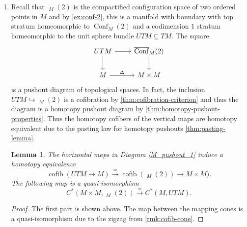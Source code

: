 \documentclass{scrartcl}
\theoremstyle{plain}
\newtheorem{lemma}[theorem]{Lemma}
\theoremstyle{definition}
\renewcommand{\subset}{\subseteq}
\DeclareMathOperator{\cone}{cone}
\DeclareMathOperator{\cofib}{cofib}
\newcommand{\quiso}{\simeq}
\let\xto\xrightarrow
\newcommand{\injto}{\hookrightarrow}
\DeclareMathOperator{\Conf}{Conf}
\DeclareMathOperator{\cConf}{\overline{Conf}}
\begin{document}
\begin{enumerate}[(1)]
    \item
Recall that $\cConf_M(2)$ is the compactified configuration space of two ordered points in $M$ and by \cref{ex:conf-2}, this is a manifold with boundary with top stratum homeomorphic to $\Conf_M(2)$ and a codimension $1$ stratum homeomorphic to the unit sphere bundle $UTM\subset TM$. The square
\begin{equation}\label{M_pushout_1}
\begin{tikzcd}
    UTM \dar\rar & \cConf_M(2)\dar \\
    M \rar["\Delta"] & M\times M
\end{tikzcd}
\end{equation}
is a pushout diagram of topological spaces. In fact, the inclusion $UTM \injto \cConf_M(2)$ is a cofibration by \cref{thm:cofibration-criterion} and thus the diagram is a homotopy pushout diagram by \cref{thm:homotopy-pushout-properties}. Thus the homotopy cofibers of the vertical maps are homotopy equivalent due to the pasting law for homotopy pushouts \cref{thm:pasting-lemma}. 


\begin{lemma}\label{lem:M-cofib-hteq}
    The horizontal maps in Diagram \ref{M_pushout_1} induce a homotopy equivalence $$\cofib(UTM\to M) \xto{\quiso} \cofib(\cConf_M(2))\to M\times M).$$
    The following map is a quasi-isomorphism $$C^*(M\times M, \cConf_M(2))\xto{\quiso} C^*(M, UTM).$$
\end{lemma}
\begin{proof}
    The first part is shown above. The map between the mapping cones is a quasi-isomorphism due to the zigzag from \cref{rmk:cofib-cone}. 
\end{proof}


\end{enumerate}
\end{document}

